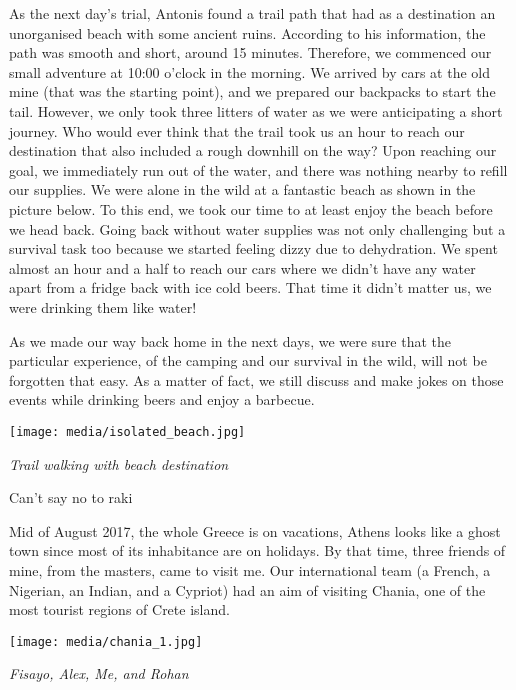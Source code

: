 \documentclass[10pt,a4paper]{article} %
\newcommand{\NewsItem}[1]{ %
\usefont{T1}{fvs}{n}{n} %
\vspace{24pt}\large #1\vspace{3pt} %
\par \normalsize \normalfont}
\begin{document}
\begin{multicols}{3}
As the next day's trial, Antonis found a trail path that had as a destination
an unorganised beach with some ancient ruins. 
According to his information, the path was smooth and short, around 15 minutes. 
Therefore, we commenced our small adventure at 10:00 o'clock in the morning. 
We arrived by cars at the old mine (that was the starting point),
and we prepared our backpacks to start the tail. 
However, we only took three litters of water as we were anticipating a short journey. 
Who would ever think that the trail took us an hour to reach our destination
that also included a rough downhill on the way?
Upon reaching our goal, we immediately run out of the water,
and there was nothing nearby to refill our supplies. 
We were alone in the wild at a fantastic beach as shown in the picture below. 
To this end, we took our time to at least enjoy the beach before we head back. 
Going back without water supplies was not only challenging but a survival task too
because we started feeling dizzy due to dehydration.   
We spent almost an hour and a half to reach our cars where
we didn't have any water apart from a fridge back with ice cold beers. 
That time it didn't matter us, we were drinking them like water! 

As we made our way back home in the next days,
we were sure that the particular experience,
of the camping and our survival in the wild, will not be forgotten that easy. 
As a matter of fact, we still discuss and make jokes on those events while 
drinking beers and enjoy a barbecue.

\begin{center}
	\texttt{[image: media/isolated\_beach.jpg]}
	\par\textit{Trail walking with beach destination}
\end{center}

\NewsItem{Can't say no to raki}
Mid of August 2017, the whole Greece is on vacations,
Athens looks like a ghost town since most of its inhabitance are on holidays. 
By that time, three friends of mine, from the masters, came to visit me. 
Our international team (a French, a Nigerian, an Indian, and a Cypriot)
had an aim of visiting Chania, one of the most tourist regions of Crete island.   

\begin{center}
	\texttt{[image: media/chania\_1.jpg]}
	\par\textit{Fisayo, Alex, Me, and Rohan}
\end{center}


\end{multicols}
\end{document}
